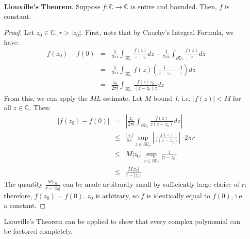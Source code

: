 \textbf{Liouville's Theorem}. Suppose $f:\mathbb{C}\to\mathbb{C}$ is entire and bounded. Then, $f$ is constant.

\begin{proof}
    Let $z_0\in \mathbb{C}$, $r>|z_0|$. First, note that by Cauchy's Integral Formula, we have: \begin{eqnarray*}
        f(z_0) - f(0) &=& \frac{1}{2\pi i} \int_{\partial \mathbb{D}_r} \frac{f(z)}{z-z_0} dz - \frac{1}{2\pi i}\int_{\partial\mathbb{D}_r} \frac{f(z)}{z} dz\\
        &=& \frac{1}{2\pi i} \int_{\partial\mathbb{D}_r} f(z) \left(\frac{1}{z-z_0} - \frac{1}{z}\right)dz\\
        &=& \frac{z_0}{2\pi i} \int_{\partial\mathbb{D}_r} \frac{f(z)z_0}{(z-z_0)z}dz
    \end{eqnarray*} From this, we can apply the $ML$ estimate. Let $M$ bound $f$, i.e. $|f(z)|<M$ for all $z\in\mathbb{C}$. Then: \begin{eqnarray*}
        |f(z_0)-f(0)| &=& \left|\frac{z_0}{2\pi i} \int_{\partial\mathbb{D}_r} \frac{f(z)}{z(z-z_0)}dz\right|\\
        &\leq& \frac{|z_0|}{2\pi}\sup_{z\in\partial\mathbb{D}_r} \left|\frac{f(z)}{z(z-z_0)}\right|\cdot 2\pi r\\
        &\leq& M|z_0| \sup_{z\in\partial\mathbb{D}_r} \frac{1}{|z-z_0|}\\
        &\leq& \frac{M|z_0|}{r-|z_0|}
    \end{eqnarray*} The quantity $\frac{M|z_0|}{r-|z_0|}$ can be made arbitrarily small by sufficiently large choice of $r$; therefore, $f(z_0)=f(0)$. $z_0$ is arbitrary, so $f$ is identically equal to $f(0)$, i.e. a constant.
\end{proof}

Liouville's Theorem can be applied to show that every complex polynomial can be factored completely.

